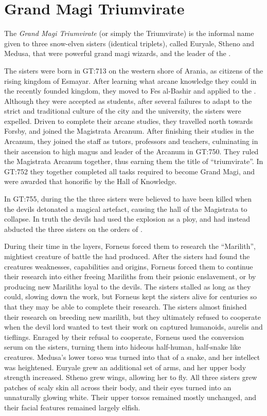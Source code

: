 \section{Grand Magi Triumvirate}
\label{sec:Triumvirate}

The \emph{Grand Magi Triumvirate} (or simply the Triumvirate) is the informal
name given to three snow-elven sisters (identical triplets), called Euryale,
Stheno and Medusa, that were powerful grand magi wizards, and the leader of the
.

The sisters were born in GT:713 on the western shore of Arania, as citizens of
the rising kingdom of Esmayar. After learning what arcane knowledge they could
in the recently founded kingdom, they moved to Fes al-Bashir and applied to the
. Although they were accepted as students, after
several failures to adapt to the strict and traditional culture of the city and
the university, the sisters were expelled. Driven to complete their arcane
studies, they travelled north towards Forsby, and joined the Magistrata
Arcanum. After finishing their studies in the Arcanum, they joined the staff
as tutors, professors and teachers, culminating in their ascension to high
magus and leader of the Arcanum in GT:750. They ruled the Magistrata Arcanum
together, thus earning them the title of ``triumvirate''. In GT:752 they
together completed all tasks required to become Grand Magi, and were awarded
that honorific by the Hall of Knowledge.

In GT:755, during the  the three sisters
were believed to have been killed when the devils detonated a magical
artefact, causing the hall of the Magistrata to collapse. In truth the devils
had used the explosion as a ploy, and had instead abducted the three sisters
on the orders of .

During their time in the layers, Forneus forced them to research the
``Marilith'', mightiest creature of battle the  had
produced. After the sisters had found the creatures weaknesses, capabilities
and origins, Forneus forced them to continue their research into either
freeing Mariliths from their psionic enslavement, or by producing new
Mariliths loyal to the devils. The sisters stalled as long as they could,
slowing down the work, but Forneus kept the sisters alive for centuries so
that they may be able to complete their research. The sisters almost finished
their research on breeding new marilith, but they ultimately refused to
cooperate when the devil lord wanted to test their work on captured humanoids,
aurelis and tieflings. Enraged by their refusal to cooperate, Forneus used the
conversion serum on the sisters, turning them into hideous half-human,
half-snake like creatures. Medusa's lower torso was turned into that of a
snake, and her intellect was heightened. Euryale grew an additional set of arms,
and her upper body strength increased. Stheno grew wings, allowing her to fly.
All three sisters grew patches of scaly skin all across their body, and their
eyes turned into an unnaturally glowing white. Their upper torsos remained
mostly unchanged, and their facial features remained largely elfish.

